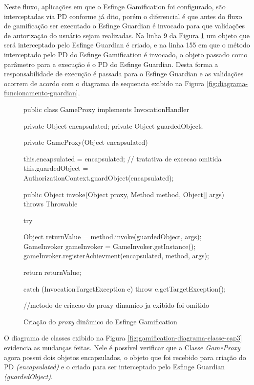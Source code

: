 \par Neste fluxo, aplicações em que o Esfinge Gamification foi configurado, são interceptadas via PD conforme já dito, porém o diferencial é que antes do fluxo de gamificação ser executado o Esfinge Guardian é invocado para que validações de autorização do usuário sejam realizadas. Na linha 9 da Figura \ref{fig:esfinge-proxy} um objeto que será interceptado pelo Esfinge Guardian é criado, e na linha 155 em que o método interceptado pelo PD do Esfinge Gamification é invocado, o objeto passado como parâmetro para a execução é o PD do Esfinge Guardian. Desta forma a responsabilidade de execução é passada para o Esfinge Guardian e as validações ocorrem de acordo com o diagrama de sequencia exibido na Figura \ref{fig:diagrama-funcionamento-guardian}.

\begin{figure}[H]
    \centering
    \caption{Criação do \textit{proxy} dinâmico do Esfinge Gamification}
    \begin{java}
public class GameProxy implements InvocationHandler {

    private Object encapsulated;
	private Object guardedObject; 
    
    private GameProxy(Object encapsulated) {
        this.encapsulated = encapsulated;
    	// tratativa de excecao omitida
    	this.guardedObject = AuthorizationContext.guardObject(encapsulated);
    	
    }

    public Object invoke(Object proxy, Method method, Object[] args) throws Throwable {
    	try {
        	Object returnValue = method.invoke(guardedObject, args);
        	GameInvoker gameInvoker = GameInvoker.getInstance();
        	gameInvoker.registerAchievment(encapsulated, method, args);
    
    	    return returnValue;
    	} catch (InvocationTargetException e) {
    	    throw e.getTargetException();
    	}
    }
    
    //metodo de criacao do proxy dinamico ja exibido foi omitido
}
    \end{java}
    \label{fig:esfinge-proxy}
\end{figure}

\par O diagrama de classes exibido na Figura \ref{fig:gamification-diagrama-classe-cap3} evidencia as mudanças feitas. Nele é possível verificar que a Classe \textit{GameProxy} agora possui dois objetos encapsulados, o objeto que foi recebido para criação do PD \textit{(encapsulated)} e o criado para ser interceptado pelo Esfinge Guardian \textit{(guardedObject)}.

